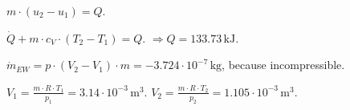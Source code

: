\( m \cdot (u_2 - u_1) = Q \).  

\( \dot{Q} + m \cdot c_V \cdot (T_2 - T_1) = Q \).  
\( \Rightarrow Q = 133.73 \, \text{kJ} \).  

\( \dot{m}_{EW} = p \cdot (V_2 - V_1) \cdot m = -3.724 \cdot 10^{-7} \, \text{kg} \), because incompressible.  

\( V_1 = \frac{m \cdot R \cdot T_1}{p_1} = 3.14 \cdot 10^{-3} \, \text{m}^3 \).  
\( V_2 = \frac{m \cdot R \cdot T_2}{p_2} = 1.105 \cdot 10^{-3} \, \text{m}^3 \).